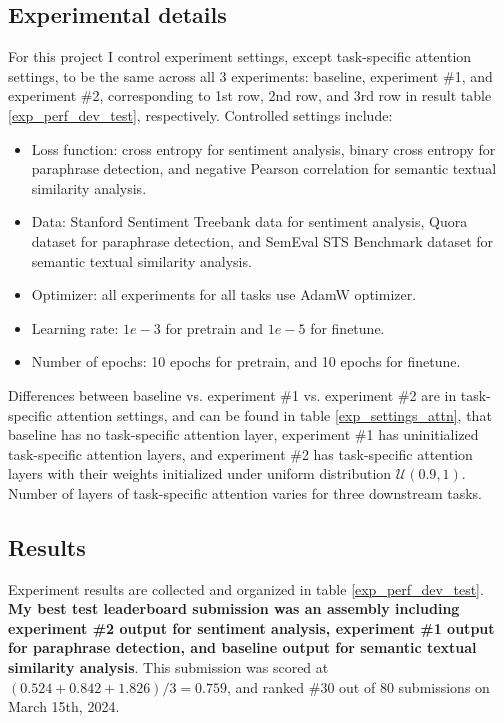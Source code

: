 \documentclass{article}
\begin{document}
\subsection{Experimental details}
\label{exp_details}
For this project I control experiment settings, except task-specific attention settings, to be the same across all 3 experiments: baseline, experiment \#1, and experiment \#2, corresponding to 1st row, 2nd row, and 3rd row in result table \ref{exp_perf_dev_test}, respectively. Controlled settings include:

\begin{itemize}
    \item Loss function: cross entropy for sentiment analysis, binary cross entropy for paraphrase detection, and negative Pearson correlation for semantic textual similarity analysis. 
    \item Data: Stanford Sentiment Treebank data for sentiment analysis, Quora dataset for paraphrase detection, and SemEval STS Benchmark dataset for semantic textual similarity analysis.
    \item Optimizer: all experiments for all tasks use AdamW optimizer.
    \item Learning rate: $1e-3$ for pretrain and $1e-5$ for finetune.
    \item Number of epochs: 10 epochs for pretrain, and 10 epochs for finetune.
\end{itemize}

Differences between baseline vs. experiment \#1 vs. experiment \#2 are in task-specific attention settings, and can be found in table \ref{exp_settings_attn}, that baseline has no task-specific attention layer, experiment \#1 has uninitialized task-specific attention layers, and experiment \#2 has task-specific attention layers with their weights initialized under uniform distribution $\mathcal{U}(0.9, 1)$. Number of layers of task-specific attention varies for three downstream tasks.


\subsection{Results}
\label{results}

Experiment results are collected and organized in table \ref{exp_perf_dev_test}. \textbf{My best test leaderboard submission was an assembly including experiment \#2 output for sentiment analysis, experiment \#1 output for paraphrase detection, and baseline output for semantic textual similarity analysis}. This submission was scored at $(0.524 + 0.842 + 1.826) / 3 = 0.759$, and ranked \#30 out of 80 submissions on March 15th, 2024.  
\end{document}
